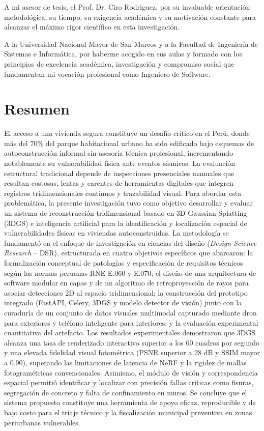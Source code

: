 \documentclass[12pt,oneside]{report}
\begin{document}
A mi asesor de tesis, el Prof. Dr. Ciro Rodriguez, por su invaluable orientación metodológica, su tiempo, su exigencia académica y su motivación constante para alcanzar el máximo rigor científico en esta investigación.

A la Universidad Nacional Mayor de San Marcos y a la Facultad de Ingeniería de Sistemas e Informática, por haberme acogido en sus aulas y formado con los principios de excelencia académica, investigación y compromiso social que fundamentan mi vocación profesional como Ingeniero de Software.

\chapter*{Resumen}
El acceso a una vivienda segura constituye un desafío crítico en el Perú, donde más del 70\% del parque habitacional urbano ha sido edificado bajo esquemas de autoconstrucción informal sin asesoría técnica profesional, incrementando notablemente su vulnerabilidad física ante eventos sísmicos. La evaluación estructural tradicional depende de inspecciones presenciales manuales que resultan costosas, lentas y carentes de herramientas digitales que integren registros tridimensionales continuos y trazabilidad visual. Para abordar esta problemática, la presente investigación tuvo como objetivo desarrollar y evaluar un sistema de reconstrucción tridimensional basado en 3D Gaussian Splatting (3DGS) e inteligencia artificial para la identificación y localización espacial de vulnerabilidades físicas en viviendas autoconstruidas. La metodología se fundamentó en el enfoque de investigación en ciencias del diseño (\textit{Design Science Research} -- DSR), estructurada en cuatro objetivos específicos que abarcaron: la formalización conceptual de patologías y especificación de requisitos técnicos según las normas peruanas RNE E.060 y E.070; el diseño de una arquitectura de software modular en capas y de un algoritmo de retroproyección de rayos para asociar detecciones 2D al espacio tridimensional; la construcción del prototipo integrado (FastAPI, Celery, 3DGS y modelo detector de visión) junto con la curaduría de un conjunto de datos visuales multimodal capturado mediante dron para exteriores y teléfono inteligente para interiores; y la evaluación experimental cuantitativa del artefacto. Los resultados experimentales demostraron que 3DGS alcanza una tasa de renderizado interactivo superior a los 60 cuadros por segundo y una elevada fidelidad visual fotométrica (PSNR superior a 28 dB y SSIM mayor a 0.90), superando las limitaciones de latencia de NeRF y la rigidez de mallas fotogramétricas convencionales. Asimismo, el módulo de visión y correspondencia espacial permitió identificar y localizar con precisión fallas críticas como fisuras, segregación de concreto y falta de confinamiento en muros. Se concluye que el sistema propuesto constituye una herramienta de apoyo eficaz, reproducible y de bajo costo para el triaje técnico y la fiscalización municipal preventiva en zonas periurbanas vulnerables.
\end{document}
